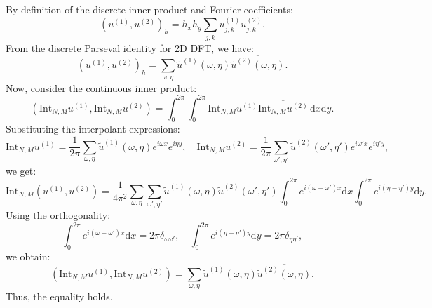 \documentclass[12pt]{article}
\begin{document}
\begin{enumerate}
                By definition of the discrete inner product and Fourier coefficients:
                \begin{equation*}
                    (u^{(1)}, u^{(2)})_h = h_x h_y \sum_{j,k} u^{(1)}_{j,k} u^{(2)}_{j,k}.
                \end{equation*}
                From the discrete Parseval identity for 2D DFT, we have:
                \begin{equation*}
                    (u^{(1)}, u^{(2)})_h = \sum_{\omega,\eta} \tilde{u}^{(1)}(\omega, \eta) \overline{\tilde{u}^{(2)}(\omega, \eta)}.
                \end{equation*}
                Now, consider the continuous inner product:
                \begin{equation*}
                    (\text{Int}_{N,M} u^{(1)}, \text{Int}_{N,M} u^{(2)}) = \int_0^{2\pi} \int_0^{2\pi} \text{Int}_{N,M} u^{(1)} \overline{\text{Int}_{N,M} u^{(2)}} \, \text{d}x \text{d}y.
                \end{equation*}
                Substituting the interpolant expressions:
                \begin{equation*}
                    \text{Int}_{N,M} u^{(1)} = \frac{1}{2\pi} \sum_{\omega,\eta} \tilde{u}^{(1)}(\omega, \eta) e^{i\omega x} e^{i\eta y}, \quad
                    \text{Int}_{N,M} u^{(2)} = \frac{1}{2\pi} \sum_{\omega',\eta'} \tilde{u}^{(2)}(\omega', \eta') e^{i\omega' x} e^{i\eta' y},
                \end{equation*}
                we get:
                \begin{equation*}
                    \text{Int}_{N,M} (u^{(1)}, u^{(2)}) = \frac{1}{4\pi^2} \sum_{\omega,\eta} \sum_{\omega',\eta'} \tilde{u}^{(1)}(\omega, \eta) \overline{\tilde{u}^{(2)}(\omega', \eta')} \int_0^{2\pi} e^{i(\omega - \omega')x} \text{d}x \int_0^{2\pi} e^{i(\eta - \eta')y} \text{d}y.
                \end{equation*}
                Using the orthogonality:
                \begin{equation*}
                    \int_0^{2\pi} e^{i(\omega - \omega')x} \text{d}x = 2\pi \delta_{\omega \omega'}, \quad \int_0^{2\pi} e^{i(\eta - \eta')y} \text{d}y = 2\pi \delta_{\eta \eta'},
                \end{equation*}
                we obtain:
                \begin{equation*}
                    (\text{Int}_{N,M} u^{(1)}, \text{Int}_{N,M} u^{(2)}) = \sum_{\omega,\eta} \tilde{u}^{(1)}(\omega, \eta) \overline{\tilde{u}^{(2)}(\omega, \eta)}.
                \end{equation*}
                Thus, the equality holds.
                \newpage


\end{enumerate}
\end{document}
